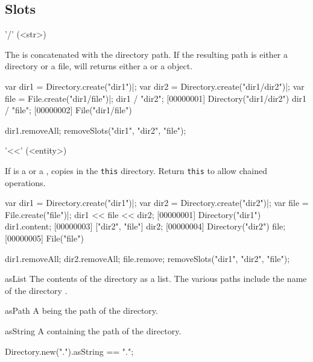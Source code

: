 \subsection{Slots}
\begin{urbiscriptapi}
\item['/'](<str>)
  \experimental{}

  The   is concatenated with the directory path.
  If the resulting path is either a directory or a file,  will
  returns either a  or a  object.
\begin{urbiscript}
var dir1 = Directory.create("dir1")|;
var dir2 = Directory.create("dir1/dir2")|;
var file = File.create("dir1/file")|;
dir1 / "dir2";
[00000001] Directory("dir1/dir2")
dir1 / "file";
[00000002] File("dir1/file")
\end{urbiscript}
\begin{urbicomment}
dir1.removeAll;
removeSlots("dir1", "dir2", "file");
\end{urbicomment}


\item['<<'](<entity>)
  \experimental{}

  If  is a  or a ,
   copies  in the \lstinline|this| directory.
  Return \lstinline|this| to allow chained operations.
\begin{urbiscript}
var dir1 = Directory.create("dir1")|;
var dir2 = Directory.create("dir2")|;
var file = File.create("file")|;
dir1 << file << dir2;
[00000001] Directory("dir1")
dir1.content;
[00000003] ["dir2", "file"]
dir2;
[00000004] Directory("dir2")
file;
[00000005] File("file")
\end{urbiscript}
\begin{urbicomment}
dir1.removeAll;
dir2.removeAll;
file.remove;
removeSlots("dir1", "dir2", "file");
\end{urbicomment}


\item[asList]
  The contents of the directory as a  list.  The
  various paths include the name of the directory \this.


\item[asPath] A  being the path of the directory.


\item[asString] A  containing the path of the directory.
\begin{urbiassert}
Directory.new(".").asString == ".";
\end{urbiassert}



\end{urbiscriptapi}
